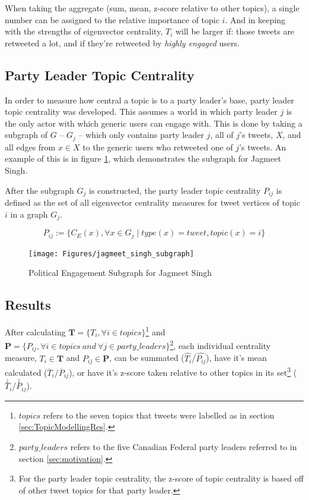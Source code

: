 When taking the aggregate (sum, mean, z-score relative to other topics), a
single number can be assigned to the relative importance of topic $i$. And in
keeping with the strengths of eigenvector centrality, $T_{i}$ will be larger if:
those tweets are retweeted a lot, and if they're retweeted by \emph{highly
engaged} users.

\subsection{Party Leader Topic Centrality}\label{sec:LeaderCentrality}

In order to measure how central a topic is to a party leader's base, party
leader topic centrality was developed. This assumes a world in which party
leader $j$ is the only actor with which generic users can engage with. This is
done by taking a subgraph of $G$ -- $G_{j}$ -- which only contains party leader
$j$, all of $j$'s tweets, $X$, and all edges from $x\in X$ to the generic users
who retweeted one of $j$'s tweets. An example of this is in figure
\ref{fig:jagmeet_singh_subgraph}, which demonstrates the subgraph for Jagmeet
Singh. 

After the subgraph $G_j$ is constructed, the party leader topic
centrality $P_{ij}$ is defined as the set of all eigenvector centrality measures
for tweet vertices of topic $i$ in a graph $G_{j}$.

\begin{equation}
    P_{ij} := \{ C_{E}(x) ,  \forall x \in G_{j} \mid type(x)=tweet, topic(x)=i \}
\end{equation}

\begin{singlespacing}
    \begin{figure}[H]
    \centering
    \texttt{[image: Figures/jagmeet\_singh\_subgraph]}
    \caption[Political Engagement Subgraph for Jagmeet Singh]{Political Engagement Subgraph for Jagmeet Singh}
    \label{fig:jagmeet_singh_subgraph}
    \end{figure}
\end{singlespacing}

\subsection{Results}\label{sec:TopicCentralityResults}

After calculating $\textbf{T}=\{T_{i}, \forall i \in topics\}$\footnote{$topics$
refers to the seven topics that tweets were labelled as in section
\ref{sec:TopicModellingRes}.} and $\textbf{P}=\{P_{ij}, \forall i \in
topics\:and\:\forall j \in party\_leaders\}$\footnote{$party\_leaders$ refers to
the five Canadian Federal party leaders referred to in section
\ref{sec:motivation}.}, each individual centrality measure, $T_{i} \in
\textbf{T}$ and $P_{ij}\in \textbf{P}$, can be summated
($\hat{T_{i}}$/$\hat{P_{ij}}$), have it's mean calculated
($\overline{T}_{i}$/$\overline{P}_{ij}$), or have it's z-score taken relative to
other topics in its set\footnote{For the party leader topic centrality, the
z-score of topic centrality is based off of other tweet topics for that party
leader.} ($\stackrel{z}{T}_{i}$/$\stackrel{z}{P}_{ij}$).

